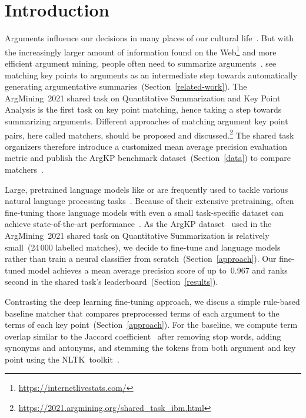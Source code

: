 \section{Introduction}\label{introduction}

Arguments influence our decisions in many places of our cultural life~\cite{Bar-HaimEFKLS2020}.
But with the increasingly larger amount of information found on the Web\footnote{\url{https://internetlivestats.com/}} and more efficient argument mining, people often need to summarize arguments~\cite{LawrenceR2019,Bar-HaimEFKLS2020}.
\citet{Bar-HaimEFKLS2020} see matching key points to arguments as an intermediate step towards automatically generating argumentative summaries~(Section~\ref{related-work}).
The ArgMining~2021 shared task on Quantitative Summarization and Key Point Analysis is the first task on key point matching, hence taking a step towards summarizing arguments.
Different approaches of matching argument key point pairs, here called matchers, should be proposed and discussed.\footnote{\url{https://2021.argmining.org/shared_task_ibm.html}}
The shared task organizers therefore introduce a customized mean average precision evaluation metric and publish the ArgKP benchmark dataset~(Section~\ref{data}) to compare matchers~\cite{Bar-HaimEFKLS2020}. %

Large, pretrained language models like \Bert or \Roberta are frequently used to tackle various natural language processing tasks~\cite{DevlinCLT2019,LiuOGDJCLLZS2019}. %
Because of their extensive pretraining, often fine-tuning those language models with even a small task-specific dataset can achieve state-of-the-art performance~\cite{DevlinCLT2019}.
As the ArgKP dataset~\cite{Bar-HaimEFKLS2020} used in the ArgMining~2021 shared task on Quantitative Summarization is relatively small~(24\,000 labelled matches), we decide to fine-tune \Bert and \Roberta language models rather than train a neural classifier from scratch~(Section~\ref{approach}).
Our fine-tuned \RobertaBase model achieves a mean average precision score of up to~0.967 and ranks second in the shared task's leaderboard~(Section~\ref{results}).

Contrasting the deep learning fine-tuning approach, we discus a simple rule-based baseline matcher that compares preprocessed terms of each argument to the terms of each key point~(Section~\ref{approach}). For the baseline, we compute term overlap similar to the Jaccard coefficient~\cite{Jaccard1902} after removing stop words, adding synonyms and antonyms, and stemming the tokens from both argument and key point using the NLTK~toolkit~\cite{BirdL2004}.